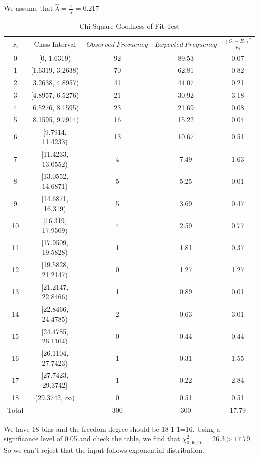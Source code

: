 \documentclass{article}
\begin{document}
We assume that $\hat{\lambda}=\frac{1}{\bar{X}}=0.217$
\begin{table}[htp]
\caption{Chi-Square Goodness-of-Fit Test}
\begin{center}
\begin{tabular}{ccccc}
\hline
$x_i$ & Class Interval & $Observed\ Frequency$ & $Expected\ Frequency$ & $\frac{(O_i-E_i)^2}{E_i}$\\
0&[0, 1.6319)&92&89.53&0.07\\
1&[1.6319, 3.2638)&70&62.81&0.82\\
2&[3.2638, 4.8957)&41&44.07&0.21\\
3&[4.8957, 6.5276)&21&30.92&3.18\\
4&[6.5276, 8.1595)&23&21.69&0.08\\
5&[8.1595, 9.7914)&16&15.22&0.04\\
6&[9.7914, 11.4233)&13&10.67&0.51\\
7&[11.4233, 13.0552)&4&7.49&1.63\\
8&[13.0552, 14.6871)&5&5.25&0.01\\
9&[14.6871, 16.319)&5&3.69&0.47\\
10&[16.319, 17.9509)&4&2.59&0.77\\
11&[17.9509, 19.5828)&1&1.81&0.37\\
12&[19.5828, 21.2147)&0&1.27&1.27\\
13&[21.2147, 22.8466)&1&0.89&0.01\\
14&[22.8466, 24.4785)&2&0.63&3.01\\
15&[24.4785, 26.1104)&0&0.44&0.44\\
16&[26.1104, 27.7423)&1&0.31&1.55\\
17&[27.7423, 29.3742]&1&0.22&2.84\\
18&(29.3742, $\infty$)&0&0.51&0.51\\
\hline
Total& &300&300&17.79\\

\hline

\end{tabular}
\end{center}
\label{default}
\end{table}%

We have 18 bins and the freedom degree should be 18-1-1=16. Using a significance level of 0.05 and check the table, we find that $\chi^2_{0.05, 16}=26.3 > 17.79$. So we can't reject that the input follows exponential distribution.
\end{document}
